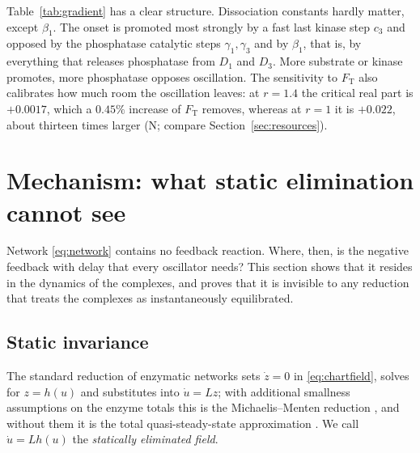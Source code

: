 \documentclass[11pt,a4paper]{article}
\theoremstyle{plain}
\theoremstyle{definition}
\theoremstyle{remark}
\newcommand{\FT}{F_{\mathrm T}}
\newcommand{\evN}{\textsf{N}}
\begin{document}
Table~\ref{tab:gradient} has a clear structure. Dissociation constants hardly matter, except $\beta_1$. The onset is promoted most strongly by a fast last kinase step $c_3$ and opposed by the phosphatase catalytic steps $\gamma_1,\gamma_3$ and by $\beta_1$, that is, by everything that releases phosphatase from $D_1$ and $D_3$. More substrate or kinase promotes, more phosphatase opposes oscillation. The sensitivity to $\FT$ also calibrates how much room the oscillation leaves: at $r=1.4$ the critical real part is $+0.0017$, which a $0.45\%$ increase of $\FT$ removes, whereas at $r=1$ it is $+0.022$, about thirteen times larger (\evN; compare Section~\ref{sec:resources}).

\section{Mechanism: what static elimination cannot see}\label{sec:mechanism}
Network \eqref{eq:network} contains no feedback reaction. Where, then, is the negative feedback with delay that every oscillator needs? This section shows that it resides in the dynamics of the complexes, and proves that it is invisible to any reduction that treats the complexes as instantaneously equilibrated.

\subsection{Static invariance}
The standard reduction of enzymatic networks sets $\dot z=0$ in \eqref{eq:chartfield}, solves for $z=h(u)$ and substitutes into $\dot u=Lz$; with additional smallness assumptions on the enzyme totals this is the Michaelis--Menten reduction \cite{SegelSlemrod89}, and without them it is the total quasi-steady-state approximation \cite{Ciliberto07}. We call $\dot u=Lh(u)$ the \emph{statically eliminated field}.
\end{document}
